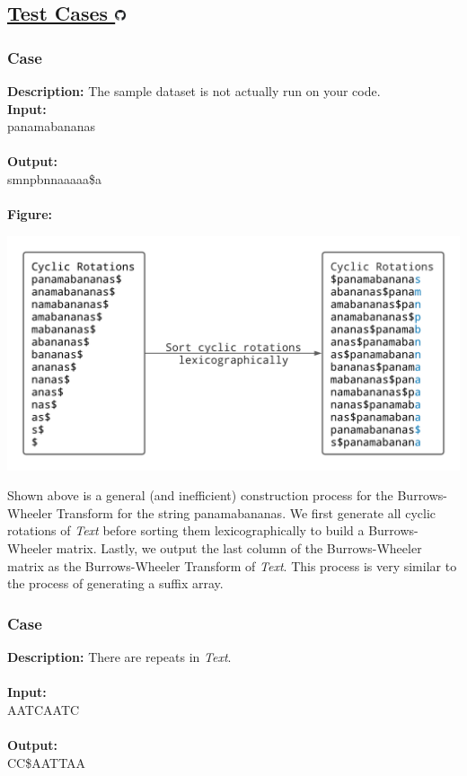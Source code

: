 \documentclass{article}
\newcommand{\code}[1]{{\fontfamily{pcr}\selectfont #1}}
\newcommand{\gitlogo}{\includegraphics[height=12.5]{c0/gitlogo.png}}
\begin{document}
\subsection*{\href{https://github.com/rjeveloff/BA_problemregister/tree/main/test_cases/chapter_9/9I}{Test Cases \gitlogo}}
\subsubsection*{Case }
\hline \vspace{5}
\textbf{Description:} The sample dataset is not actually run on your code.\\
\noindent \textbf{Input:}\\
\code{panamabananas}\\ \\
\noindent \textbf{Output:}\\
\code{smnpbnnaaaaa\$a}\\ \\
\noindent \textbf{Figure:}
\begin{center}
    \includegraphics[scale=0.16]{c9/figures/9I.png}
\end{center}
\noindent Shown above is a general (and inefficient) construction process for the Burrows-Wheeler Transform for the string \code{panamabananas}. We first generate all cyclic rotations of \emph{Text} before sorting them lexicographically to build a Burrows-Wheeler matrix. Lastly, we output the last column of the Burrows-Wheeler matrix as the Burrows-Wheeler Transform of \emph{Text}. This process is very similar to the process of generating a suffix array.
\pagebreak

\subsubsection*{Case }
\hline \vspace{5}
\textbf{Description:}  There are repeats in \emph{Text}.\\ \\
\noindent \textbf{Input:}\\
\code{AATCAATC}\\ \\
\noindent \textbf{Output:}\\
\code{CC\$AATTAA}
\end{document}
